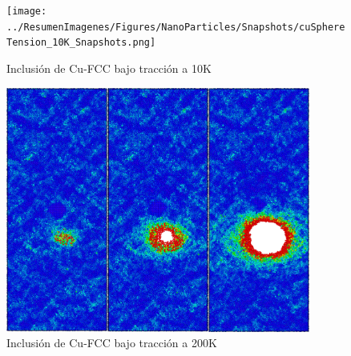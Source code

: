 \begin{figure}[htp]
\centering
\texttt{[image: ../ResumenImagenes/Figures/NanoParticles/Snapshots/cuSphereTension\_10K\_Snapshots.png]}
\caption[Inclusión de Cu-FCC bajo tracción a 10K]{Inclusión de Cu-FCC bajo tracción a 10K}
\label{C4:fg:snapshot_ten_FCC_10K}
\end{figure}

% 

\begin{figure}[htp]
\centering
\includegraphics[width=10cm]{../ResumenImagenes/Figures/NanoParticles/Snapshots/cuSphereTension_200K_Snapshots.png}
\caption[Inclusión de Cu-FCC bajo tracción a 200K]{Inclusión de Cu-FCC bajo tracción a 200K}
\label{C4:fg:snapshot_ten_FCC_200K}
\end{figure}

